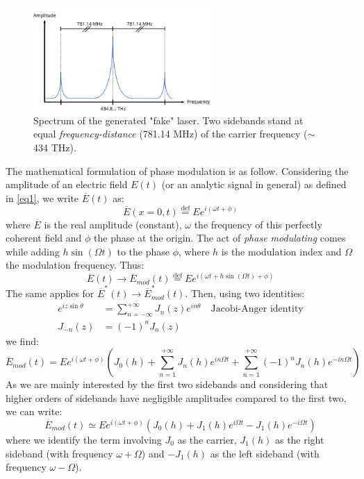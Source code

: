 \documentclass[11pt]{report}
\begin{document}
\begin{figure}[h!]
\centering
\includegraphics[width=0.6\textwidth]{sb-def}
\caption{Spectrum of the generated "fake" laser. Two sidebands stand at equal \textit{frequency-distance} (781.14 MHz) of the carrier frequency ($\sim$434 THz).}
\label{fig:sb-def}
\end{figure}

The mathematical formulation of phase modulation is as follow. Considering the amplitude of an electric field $E(t)$ (or an analytic signal in general) as defined in \eqref{eq1}, we write $\overline{E}(t)$ as:
\begin{equation}
\overline{E}(x=0, t) \stackrel{\text{def}}{=} Ee^{i(\omega t + \phi)}
\end{equation}
where $\overline{E}$ is the real amplitude (constant), $\omega$ the frequency of this perfectly coherent field and $\phi$ the phase at the origin. The act of \textit{phase modulating} comes while adding $h\sin(\Omega t)$ to the phase $\phi$, where $h$ is the modulation index and $\Omega$ the modulation frequency. Thus:
\begin{equation}
\overline{E}(t) \rightarrow \overline{E}_{mod}(t) \stackrel{\text{def}}{=} Ee^{i(\omega t + h\sin(\Omega t) + \phi)}
\end{equation}
The same applies for $\overline{E}^*(t) \rightarrow \overline{E}^*_{mod}(t)$. Then, using two identities:
\begin{align}
e^{iz\sin\theta} &= \sum_{n=-\infty}^{+\infty} J_n(z)e^{in\theta} \quad \textrm{Jacobi-Anger identity}\\
J_{-n}(z) &= (-1)^nJ_n(z)
\end{align}
we find:
\begin{equation}
\overline{E}_{mod}(t) = Ee^{i(\omega t + \phi)} \left( J_0(h) + \sum_{n=1}^{+\infty} J_n(h)e^{in\Omega t} + \sum_{n=1}^{+\infty} (-1)^n J_n(h)e^{-in\Omega t} \right)
\end{equation}
As we are mainly interested by the first two sidebands and considering that higher orders of sidebands have negligible amplitudes compared to the first two, we can write:
\begin{equation}
\overline{E}_{mod}(t) \simeq Ee^{i(\omega t + \phi)} \left( J_0(h) + J_1(h)e^{i\Omega t} - J_1(h)e^{-i\Omega t} \right)
\end{equation}
where we identify the term involving $J_0$ as the carrier, $J_1(h)$ as the right sideband (with frequency $\omega + \Omega$) and $-J_1(h)$ as the left sideband (with frequency $\omega - \Omega$).
\end{document}
